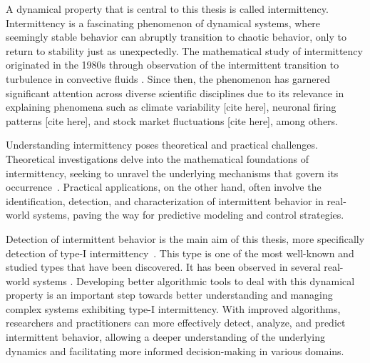 A dynamical property that is central to this thesis is called intermittency.
Intermittency is a fascinating phenomenon of dynamical systems, where seemingly stable behavior can abruptly transition to chaotic behavior, only to return to stability just as unexpectedly.
The mathematical study of intermittency originated in the 1980s through observation of the intermittent transition to turbulence in convective fluids \cite{Pomeau1980}.
Since then, the phenomenon has garnered significant attention across diverse scientific disciplines due to its relevance in explaining phenomena such as climate variability [cite here], neuronal firing patterns [cite here], and stock market fluctuations [cite here], among others.
\par
Understanding intermittency poses theoretical and practical challenges.
Theoretical investigations delve into the mathematical foundations of intermittency, seeking to unravel the underlying mechanisms that govern its occurrence~\cite{Elaskar2017, Elaskar2023}.
Practical applications, on the other hand, often involve the identification, detection, and characterization of intermittent behavior in real-world systems, paving the way for predictive modeling and control strategies.
\par
Detection of intermittent behavior is the main aim of this thesis, more specifically detection of type-I intermittency~\cite{Pomeau1980,Bussac1982,Elaskar2022,DelRio2014}.
This type is one of the most well-known and studied types that have been discovered.
It has been observed in several real-world systems \cite{Zebrowski2004,Parthimos2001,Dimitriu2008,Chiriac20070701}.
Developing better algorithmic tools to deal with this dynamical property is an important step towards better understanding and managing complex systems exhibiting type-I intermittency.
With improved algorithms, researchers and practitioners can more effectively detect, analyze, and predict intermittent behavior, allowing a deeper understanding of the underlying dynamics and facilitating more informed decision-making in various domains.



